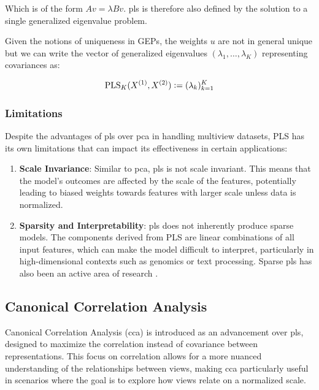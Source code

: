 Which is of the form $A v = \lambda B v$. \acrshort{pls} is therefore also defined by the solution to a single generalized eigenvalue problem.

Given the notions of uniqueness in GEPs, the \gls{weights} $u$ are not in general unique but we can write the vector of generalized eigenvalues $(\lambda_1, \dots, \lambda_K)$ representing covariances as:

\begin{align}
    \label{eq:pls-vector-of-correlations-def}
    \operatorname{PLS}_K(X^{(1)},X^{(2)}) \vcentcolon= (\lambda_k)_{k=1}^K
\end{align}

\subsubsection{Limitations} 

Despite the advantages of \acrshort{pls} over \acrshort{pca} in handling multiview datasets, PLS has its own limitations that can impact its effectiveness in certain applications:
\begin{enumerate}
    \item \textbf{Scale Invariance}: Similar to \acrshort{pca}, \acrshort{pls} is not scale invariant. This means that the model's outcomes are affected by the scale of the features, potentially leading to biased \gls{weights} towards features with larger scale unless data is normalized.
    \item \textbf{Sparsity and Interpretability}: \acrshort{pls} does not inherently produce sparse models. The components derived from PLS are linear combinations of all input features, which can make the model difficult to interpret, particularly in high-dimensional contexts such as genomics or text processing. Sparse \acrshort{pls} has also been an active area of research \citep{chun2010sparse, witten2009penalized}.
\end{enumerate}

\subsection{Canonical Correlation Analysis}\label{sec:cca}

Canonical Correlation Analysis (\acrshort{cca}) is introduced as an advancement over \acrshort{pls}, designed to maximize the correlation instead of covariance between representations. This focus on correlation allows for a more nuanced understanding of the relationships between views, making \acrshort{cca} particularly useful in scenarios where the goal is to explore how \gls{views} relate on a normalized scale.

